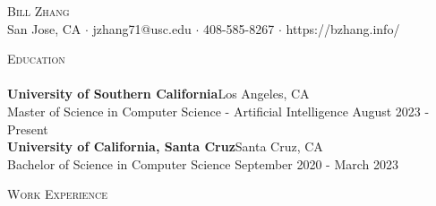 \documentclass[a4paper]{article}
\newcommand{\lineunder} {
    \vspace*{-8pt} \\
    \hspace*{-18pt} \hrulefill \\
}
\newcommand{\header} [1] {
    {\hspace*{-18pt}\vspace*{6pt} \textsc{#1}}
    \vspace*{-6pt} \lineunder
}
\begin{document}
    \vspace*{-40pt}

    

\vspace*{-10pt}
\begin{center}
  {\Huge \scshape {Bill Zhang}}\\
  San Jose, CA $\cdot$ jzhang71@usc.edu $\cdot$ 408-585-8267 $\cdot$ https://bzhang.info/\\
\end{center}

      \header{Education}
      \textbf{University of Southern California}\hfill Los Angeles, CA\\
Master of Science in Computer Science -  Artificial Intelligence \hfill August 2023 - Present\\
\vspace{2mm}
      \textbf{University of California, Santa Cruz}\hfill Santa Cruz, CA\\
Bachelor of Science in Computer Science \hfill September 2020 - March 2023\\
\vspace{2mm}

      \header{Work Experience}
      \vspace{1mm}
\end{document}
